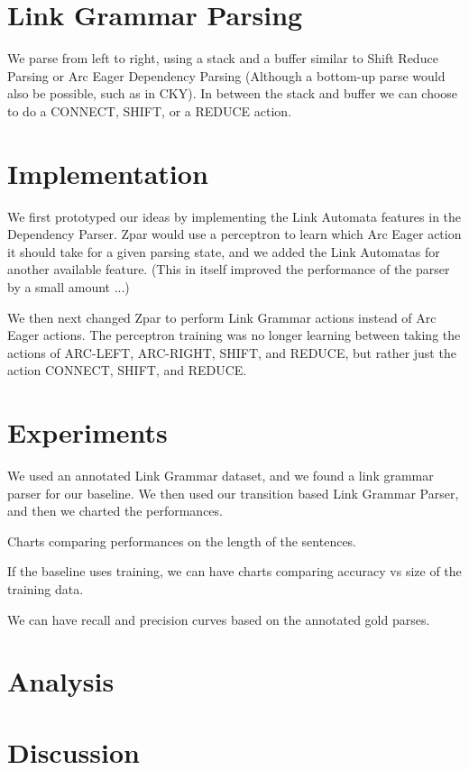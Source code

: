 \documentclass[11pt]{article}
\begin{document}
\section{Link Grammar Parsing}
We parse from left to right, using a stack and a buffer similar to Shift Reduce Parsing or Arc Eager Dependency Parsing (Although a bottom-up parse would also be possible, such as in CKY). In between the stack and buffer we can choose to do a CONNECT, SHIFT, or a REDUCE action. 


\section{Implementation}
We first prototyped our ideas by implementing the Link Automata features in the Dependency Parser. Zpar would use a perceptron to learn which Arc Eager action it should take for a given parsing state, and we added the Link Automatas for another available feature. (This in itself improved the performance of the parser by a small amount ...)

We then next changed Zpar to perform Link Grammar actions instead of Arc Eager actions. The perceptron training was no longer learning between taking the actions of ARC-LEFT, ARC-RIGHT, SHIFT, and REDUCE, but rather just the action CONNECT, SHIFT, and REDUCE.







\section{Experiments}

We used an annotated Link Grammar dataset, and we found a link grammar parser for our baseline. We then used our transition based Link Grammar Parser, and then we charted the performances.

Charts comparing performances on the length of the sentences. 

If the baseline uses training, we can have charts comparing accuracy vs size of the training data.

We can have recall and precision curves based on the annotated gold parses.


\section{Analysis}


\section{Discussion}
\end{document}
